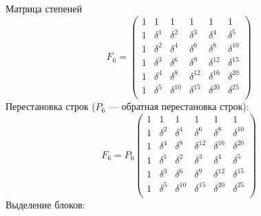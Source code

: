 Матрица степеней
\[
    F_6
    = \begin{pmatrix}
        1 & 1        & 1           & 1           & 1           & 1           \\
        1 & \delta^1 & \delta^2    & \delta^3    & \delta^4    & \delta^5    \\
        1 & \delta^2 & \delta^4    & \delta^6    & \delta^8    & \delta^{10} \\
        1 & \delta^3 & \delta^6    & \delta^9    & \delta^{12} & \delta^{15} \\
        1 & \delta^4 & \delta^8    & \delta^{12} & \delta^{16} & \delta^{20} \\
        1 & \delta^5 & \delta^{10} & \delta^{15} & \delta^{20} & \delta^{25} \\
    \end{pmatrix}
\]
Перестановка строк ($P_6$ --- обратная перестановка строк):
\[
    F_6
    = P_6
    \begin{pmatrix}
        1 & 1        & 1           & 1           & 1           & 1           \\
        1 & \delta^2 & \delta^4    & \delta^6    & \delta^8    & \delta^{10} \\
        1 & \delta^4 & \delta^8    & \delta^{12} & \delta^{16} & \delta^{20} \\
        1 & \delta^1 & \delta^2    & \delta^3    & \delta^4    & \delta^5    \\
        1 & \delta^3 & \delta^6    & \delta^9    & \delta^{12} & \delta^{15} \\
        1 & \delta^5 & \delta^{10} & \delta^{15} & \delta^{20} & \delta^{25} \\
    \end{pmatrix}
\]
Выделение блоков:
